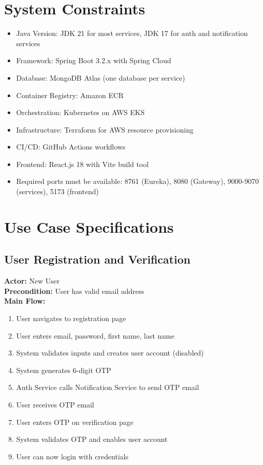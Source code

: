 \section{System Constraints}

\begin{itemize}
    \item Java Version: JDK 21 for most services, JDK 17 for auth and notification services
    \item Framework: Spring Boot 3.2.x with Spring Cloud
    \item Database: MongoDB Atlas (one database per service)
    \item Container Registry: Amazon ECR
    \item Orchestration: Kubernetes on AWS EKS
    \item Infrastructure: Terraform for AWS resource provisioning
    \item CI/CD: GitHub Actions workflows
    \item Frontend: React.js 18 with Vite build tool
    \item Required ports must be available: 8761 (Eureka), 8080 (Gateway), 9000-9070 (services), 5173 (frontend)
\end{itemize}

\section{Use Case Specifications}

\subsection{User Registration and Verification}

\textbf{Actor:} New User\\
\textbf{Precondition:} User has valid email address\\
\textbf{Main Flow:}
\begin{enumerate}
    \item User navigates to registration page
    \item User enters email, password, first name, last name
    \item System validates inputs and creates user account (disabled)
    \item System generates 6-digit OTP
    \item Auth Service calls Notification Service to send OTP email
    \item User receives OTP email
    \item User enters OTP on verification page
    \item System validates OTP and enables user account
    \item User can now login with credentials
\end{enumerate}

